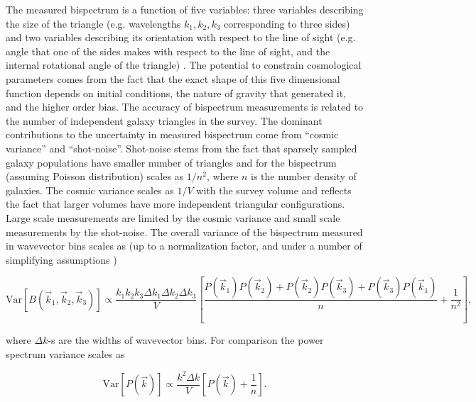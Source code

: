 The measured bispectrum is a function of five variables: three variables describing the size of the triangle (e.g.
wavelengths $k_1, k_2, k_3$ corresponding to three sides) and two variables
describing its orientation with respect to the line of sight (e.g. angle that
one of the sides makes with respect to the line of sight, and the internal
rotational angle of the triangle) \cite{2017MNRAS.467..928G}. The potential to constrain cosmological
parameters comes from the fact that the exact shape of this  five dimensional
function depends on initial conditions, the nature of gravity that generated
it, and the higher order bias. The accuracy of bispectrum measurements is
related to the number of independent galaxy triangles in the survey. The
dominant contributions to the uncertainty in measured bispectrum come from
``cosmic variance'' and ``shot-noise''. Shot-noise stems from the fact that
sparsely sampled galaxy populations have smaller number of triangles and for
the bispectrum (assuming Poisson distribution) scales as  $1/n^2$, where $n$ is
the number density of galaxies. The cosmic variance scales as $1/V$ with the
survey volume and reflects the fact that larger volumes have more independent
triangular configurations. Large scale measurements are limited by the cosmic
variance and small scale measurements by the shot-noise. The overall variance
of the bispectrum measured in wavevector bins scales as (up to a normalization
factor, and under a number of simplifying assumptions
\cite{2006PhRvD..74b3522S})  

\begin{equation}
\mathrm{Var}\left[B(\vec{k}_1,\vec{k}_2,\vec{k}_3)\right] \propto
\frac{k_1k_2k_3\Delta k_1\Delta k_2\Delta
k_3}{V}\left[\frac{P(\vec{k}_1)P(\vec{k}_2) + P(\vec{k}_2)P(\vec{k}_3) +
P(\vec{k}_3)P(\vec{k}_1)}{n} + \frac{1}{n^2}\right], 
\end{equation} 

where $\Delta k$-s are the widths of wavevector bins. For comparison the power
spectrum variance scales as \cite{1997PhRvL..79.3806T,1994ApJ...426...23F}

\begin{equation}
\mathrm{Var}\left[P(\vec{k})\right] \propto \frac{k^2\Delta
k}{V}\left[P(\vec{k}) + \frac{1}{n}\right].  
\end{equation}  

